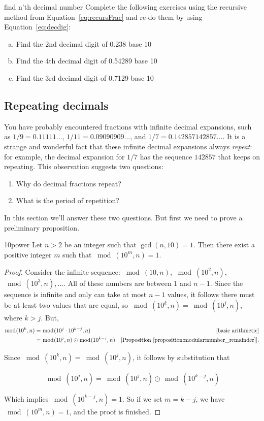 \begin{exercise} {find n'th decimal number}
Complete the following exercises using the recursive method from Equation~\eqref{eq:recursFrac} and re-do them by using Equation~\eqref{eq:decdig}:
\begin{enumerate}[(a)]
\item Find the 2nd decimal digit of 0.238 base 10
\item Find the 4th decimal digit of 0.54289 base 10
\item Find the 3rd decimal digit of 0.7129 base 10

\end{enumerate}
\end{exercise}


\subsection{Repeating decimals}
You have probably encountered  fractions with infinite decimal expansions, such as $1/9 = 0.11111\ldots$, $1/11 = 0.09090909\ldots$, and $1/7 = 0.142857142857\ldots$. It is a strange and wonderful fact that these infinite decimal expansions always \emph{repeat}: for example, the decimal expansion for $1/7$ has the sequence $142857$ that keeps on repeating. This observation suggests two questions:
\begin{enumerate}
\item Why do decimal fractions repeat?
\item What is the period of repetition?
\end{enumerate}

In this section we'll answer these two questions. But first we need to prove a preliminary proposition.

\begin{prop}{10power}
Let $n>2$ be an integer such that $\gcd(n,10)=1$. Then there exist a positive integer $m$ such that $\bmod(10^{m},n)=1$.
\end{prop}
\begin{proof}
Consider the infinite sequence: $\bmod(10,n)$, $\bmod(10^{2},n)$, $\bmod(10^{3},n),\dots$. All of these numbers are between $1$ and $n-1$. Since the sequence is infinite and only can take at most $n-1$ values, it follows there must be at least two values that are equal, so $\bmod(10^{k},n)=\bmod(10^{j},n)$, where $k>j$. But,
\begin{align*}
\bmod(10^{k},n)&=\bmod(10^{j}\cdot 10^{k-j},n) & \text{[basic arithmetic]}\\
&=\bmod(10^{j},n)\odot \bmod(10^{k-j},n) &\text{[Proposition~\ref{proposition:modular:number_remainder}]}.
\end{align*}

Since $\bmod(10^{k},n)=\bmod(10^{j},n)$, it follows by substitution that

\begin{equation*}
\bmod(10^{j},n)=\bmod(10^j,n)\odot \bmod(10^{k-j},n)
\end{equation*}

Which implies $\bmod(10^{k-j},n)=1$.
So if we set $m=k-j$, we have $\bmod(10^{m},n)=1$, and the proof is finished.
\end{proof}


